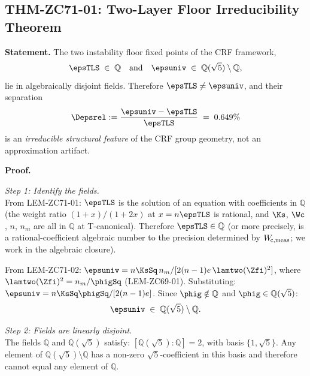 \documentclass[12pt, a4paper]{article}
\begin{document}
\subsection{THM-ZC71-01: Two-Layer Floor Irreducibility Theorem}
\label{sec:thm01}


\begin{formalbox}[title={THM-ZC71-01: Two-Layer Floor Irreducibility Theorem
  ($R_0$, Exact)}]

\textbf{Statement.}
The two instability floor fixed points of the CRF framework,
\begin{equation}
  \epsTLS \;\in\; \mathbb{Q}
  \quad\text{and}\quad
  \epsuniv \;\in\; \mathbb{Q}(\sqrt{5})\setminus\mathbb{Q},
  \label{eq:field-membership}
\end{equation}
lie in algebraically disjoint fields.
Therefore $\epsTLS \neq \epsuniv$, and their separation
\begin{equation}
  \Depsrel := \frac{\epsuniv - \epsTLS}{\epsTLS} \;=\; 0.649\%
  \label{eq:sep-numerical}
\end{equation}
is an \emph{irreducible structural feature} of the CRF group
geometry, not an approximation artifact.

\textbf{Proof.}

\textit{Step 1: Identify the fields.}\\
From LEM-ZC71-01: $\epsTLS$ is the solution of an equation
with coefficients in $\mathbb{Q}$ (the weight ratio
$(1+x)/(1+2x)$ at $x = n\epsTLS$ is rational, and $\Ks$,
$\Wc$, $n$, $n_m$ are all in $\mathbb{Q}$ at T-canonical).
Therefore $\epsTLS \in \mathbb{Q}$ (or more precisely, is a
rational-coefficient algebraic number to the precision determined
by $W_{\!\mathrm{c},{\rm meas}}$; we work in the algebraic closure).

From LEM-ZC71-02: $\epsuniv = n\KsSq\,n_m / [2(n-1)e\,\lamtwo(\Zfi)^{2}]$,
where $\lamtwo(\Zfi)^{2} = n_m/\phigSq$ (LEM-ZC69-01).
Substituting: $\epsuniv = n\KsSq\phigSq/[2(n-1)e]$.
Since $\phig \notin \mathbb{Q}$ and $\phig \in \mathbb{Q}(\sqrt{5})$:
\[
  \epsuniv \;\in\; \mathbb{Q}(\sqrt{5}) \setminus \mathbb{Q}.
\]

\textit{Step 2: Fields are linearly disjoint.}\\
The fields $\mathbb{Q}$ and $\mathbb{Q}(\sqrt{5})$ satisfy:
$[\mathbb{Q}(\sqrt{5}) : \mathbb{Q}] = 2$, with basis $\{1, \sqrt{5}\}$.
Any element of $\mathbb{Q}(\sqrt{5}) \setminus \mathbb{Q}$ has a
non-zero $\sqrt{5}$-coefficient in this basis and therefore cannot
equal any element of $\mathbb{Q}$.


\end{formalbox}
\end{document}

